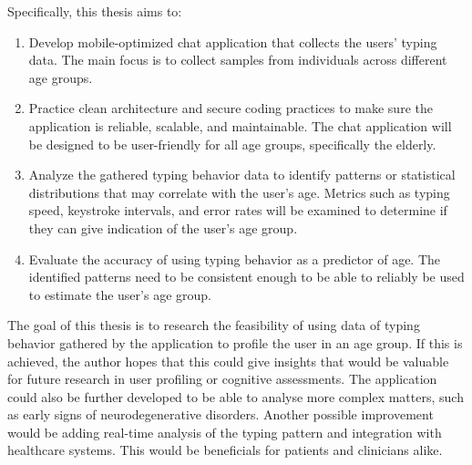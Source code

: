 Specifically, this thesis aims to:
\begin{enumerate}
    \item Develop mobile-optimized chat application that collects the users' typing data.
    The main focus is to collect samples from individuals across different age groups.
    \item Practice clean architecture and secure coding practices to make sure the application is reliable, scalable, and maintainable. 
    The chat application will be designed to be user-friendly for all age groups, specifically the elderly.
    \item Analyze the gathered typing behavior data to identify patterns or statistical distributions that may correlate with the user's age. 
    Metrics such as typing speed, keystroke intervals, and error rates will be examined to determine if they can give indication of the user's age group.
    \item Evaluate the accuracy of using typing behavior as a predictor of age.
    The identified patterns need to be consistent enough to be able to reliably be used to estimate the user's age group.
\end{enumerate}

The goal of this thesis is to research the feasibility of using data of typing behavior gathered by the application to profile the user in an age group.
If this is achieved, the author hopes that this could give insights that would be valuable for future research in user profiling or cognitive assessments.
The application could also be further developed to be able to analyse more complex matters, such as early signs of neurodegenerative disorders.
Another possible improvement would be adding real-time analysis of the typing pattern and integration with healthcare systems.
This would be beneficials for patients and clinicians alike.